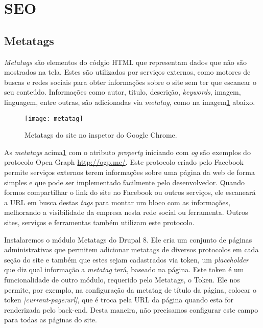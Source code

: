 \section{SEO}

\subsection{Metatags}
\textit{Metatags} são elementos do códgio HTML que representam dados que não são mostrados na tela. Estes são utilizados por serviços externos, como motores de buscas e redes sociais para obter informações sobre o site sem ter que escanear o seu conteúdo. Informações como autor, titulo, descrição, \textit{keywords}, imagem, linguagem, entre outras, são adicionadas via \textit{metatag}, como na imagem\ref{metatag} abaixo.

\begin{figure}[ht]
  \centering
  \texttt{[image: metatag]}
  \caption{Metatags do site no inspetor do Google Chrome.}
  \label{metatag}
\end{figure}

As \textit{metatags} acima\ref{metatag} com o atributo \textit{property} iniciando com \emph{og} são exemplos do protocolo Open Graph \url{http://ogp.me/}. Este protocolo criado pelo Facebook permite serviços externos terem informações sobre uma página da web de forma simples e que pode ser implementado facilmente pelo desenvolvedor. Quando formos compartilhar o link do site no Facebook ou outros serviços, ele escaneará a URL em busca destas \textit{tags} para montar um bloco com as informações, melhorando a visibilidade da empresa nesta rede social ou ferramenta. Outros sites, serviços e ferramentas também utilizam este protocolo.

Instalaremos o módulo Metatags do Drupal 8. Ele cria um conjunto de páginas administrativas  que permitem adicionar metatags de diversos protocolos em cada seção do site e também que estes sejam cadastrados via token, um \textit{placeholder} que diz qual informação a \textit{metatag} terá, baseado na página. Este token é um funcionalidade de outro módulo, requerido pelo Metatags, o Token. Ele nos permite, por exemplo, na configuração da metatag de título da página, colocar o token \textit{[current-page:url]}, que é troca pela URL da página quando esta for renderizada pelo back-end. Desta maneira, não precisamos configurar este campo para todas as páginas do site.


